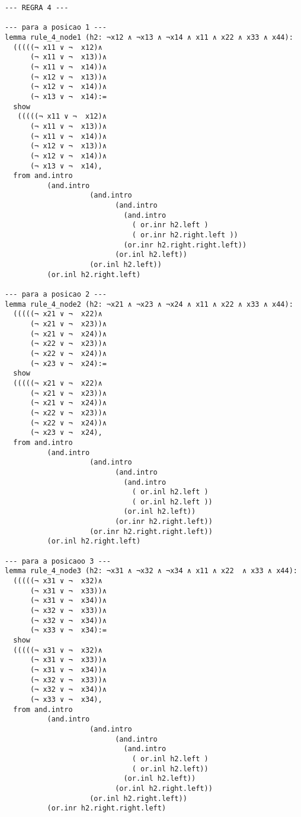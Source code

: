 \begin{enumerate}
\begin{lstlisting}
--- REGRA 4 ---

--- para a posicao 1 ---
lemma rule_4_node1 (h2: ¬x12 ∧ ¬x13 ∧ ¬x14 ∧ x11 ∧ x22 ∧ x33 ∧ x44):
  (((((¬ x11 ∨ ¬  x12)∧
      (¬ x11 ∨ ¬  x13))∧ 
      (¬ x11 ∨ ¬  x14))∧ 
      (¬ x12 ∨ ¬  x13))∧ 
      (¬ x12 ∨ ¬  x14))∧ 
      (¬ x13 ∨ ¬  x14):=
  show
   (((((¬ x11 ∨ ¬  x12)∧
      (¬ x11 ∨ ¬  x13))∧ 
      (¬ x11 ∨ ¬  x14))∧ 
      (¬ x12 ∨ ¬  x13))∧ 
      (¬ x12 ∨ ¬  x14))∧ 
      (¬ x13 ∨ ¬  x14),
  from and.intro
          (and.intro
                    (and.intro
                          (and.intro
                            (and.intro
                              ( or.inr h2.left ) 
                              ( or.inr h2.right.left ))
                            (or.inr h2.right.right.left))
                          (or.inl h2.left))
                    (or.inl h2.left))
          (or.inl h2.right.left)

--- para a posicao 2 ---
lemma rule_4_node2 (h2: ¬x21 ∧ ¬x23 ∧ ¬x24 ∧ x11 ∧ x22 ∧ x33 ∧ x44):
  (((((¬ x21 ∨ ¬  x22)∧
      (¬ x21 ∨ ¬  x23))∧ 
      (¬ x21 ∨ ¬  x24))∧ 
      (¬ x22 ∨ ¬  x23))∧ 
      (¬ x22 ∨ ¬  x24))∧ 
      (¬ x23 ∨ ¬  x24):=
  show
  (((((¬ x21 ∨ ¬  x22)∧
      (¬ x21 ∨ ¬  x23))∧ 
      (¬ x21 ∨ ¬  x24))∧ 
      (¬ x22 ∨ ¬  x23))∧ 
      (¬ x22 ∨ ¬  x24))∧ 
      (¬ x23 ∨ ¬  x24),
  from and.intro
          (and.intro
                    (and.intro
                          (and.intro
                            (and.intro
                              ( or.inl h2.left ) 
                              ( or.inl h2.left ))
                            (or.inl h2.left))
                          (or.inr h2.right.left))
                    (or.inr h2.right.right.left))
          (or.inl h2.right.left)

--- para a posicaoo 3 ---
lemma rule_4_node3 (h2: ¬x31 ∧ ¬x32 ∧ ¬x34 ∧ x11 ∧ x22  ∧ x33 ∧ x44):
  (((((¬ x31 ∨ ¬  x32)∧
      (¬ x31 ∨ ¬  x33))∧ 
      (¬ x31 ∨ ¬  x34))∧ 
      (¬ x32 ∨ ¬  x33))∧ 
      (¬ x32 ∨ ¬  x34))∧ 
      (¬ x33 ∨ ¬  x34):=
  show
  (((((¬ x31 ∨ ¬  x32)∧
      (¬ x31 ∨ ¬  x33))∧ 
      (¬ x31 ∨ ¬  x34))∧ 
      (¬ x32 ∨ ¬  x33))∧ 
      (¬ x32 ∨ ¬  x34))∧ 
      (¬ x33 ∨ ¬  x34),
  from and.intro
          (and.intro
                    (and.intro
                          (and.intro
                            (and.intro
                              ( or.inl h2.left ) 
                              ( or.inl h2.left))
                            (or.inl h2.left))
                          (or.inl h2.right.left))
                    (or.inl h2.right.left))
          (or.inr h2.right.right.left)


\end{lstlisting}
\end{enumerate}
